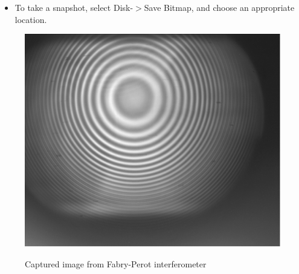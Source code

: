 \documentclass{../lab}
\begin{document}
\begin{enumerate}
\begin{itemize}
\begin{itemize}
\begin{enumerate}
                \begin{itemize}
                    \item To take a snapshot, select Disk-$>$Save Bitmap, and choose an appropriate location.
                \end{itemize}
            
            \end{enumerate}

        \end{itemize}
        
    \end{itemize}
    \begin{figure}
    \centering
        \href{http://experimentationlab.berkeley.edu/sites/default/files/images/Atmimage031.gif}{\includegraphics[width=0.6\linewidth]{images/Atmimage031.png}} \\
        \caption{Captured image from Fabry-Perot interferometer}
        \label{CapturedImage}
    \end{figure}
    

\end{enumerate}
\end{document}
